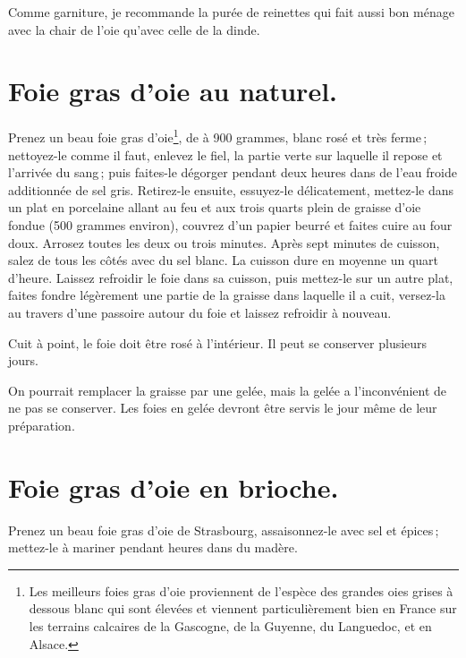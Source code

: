 Comme garniture, je recommande la purée de reinettes qui fait aussi bon
ménage avec la chair de l'oie qu'avec celle de la dinde.

\section*{\centering Foie gras d'oie au naturel.}
{}

Prenez un beau foie gras d'oie\footnote{Les meilleurs foies gras d'oie
proviennent de l'espèce des grandes oies grises à dessous blanc qui sont
élevées et viennent particulièrement bien en France sur les terrains calcaires
de la Gascogne, de la Guyenne, du Languedoc, et en Alsace.}, de {\mmm} à 900
grammes, blanc rosé et très ferme ; nettoyez-le comme il faut, enlevez le fiel,
la partie verte sur laquelle il repose et l'arrivée du sang ; puis faites-le
dégorger pendant deux heures dans de l'eau froide additionnée de sel gris.
Retirez-le ensuite, essuyez-le délicatement, mettez-le dans un plat en
porcelaine allant au feu et aux trois quarts plein de graisse d'oie fondue (500
grammes environ), couvrez d'un papier beurré et faites cuire au four doux.
Arrosez toutes les deux ou trois minutes. Après sept minutes de cuisson, salez
de tous les côtés avec du sel blanc. La cuisson dure en moyenne un quart
d'heure. Laissez refroidir le foie dans sa cuisson, puis mettez-le sur un autre
plat, faites fondre légèrement une partie de la graisse dans laquelle il a cuit,
versez-la au travers d'une passoire autour du foie et laissez refroidir
à nouveau.

Cuit à point, le foie doit être rosé à l'intérieur. Il peut se conserver plusieurs
jours.

On pourrait remplacer la graisse par une gelée, mais la gelée a l'inconvénient
de ne pas se conserver. Les foies en gelée devront être servis le jour même de
leur préparation.

\section*{\centering Foie gras d'oie en brioche.}
{}

Prenez un beau foie gras d'oie de Strasbourg, assaisonnez-le avec sel et
épices ; mettez-le à mariner pendant {\mmm} heures dans du madère.

